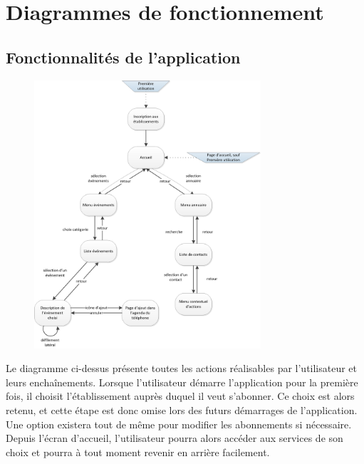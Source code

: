 \chapter{Diagrammes de fonctionnement}

\section{Fonctionnalités de l'application}

\begin{figure}[h]
  \center
  \includegraphics[width=0.75\textwidth]{resources/features1.png}
\end{figure}

\newpage

Le diagramme ci-dessus présente toutes les actions réalisables par l'utilisateur et leurs enchaînements.
Lorsque l'utilisateur démarre l'application pour la première fois, il choisit l'établissement auprès duquel il veut s'abonner.
Ce choix est alors retenu, et cette étape est donc omise lors des futurs démarrages de l'application. Une option existera tout de même pour modifier les abonnements si nécessaire. Depuis l'écran d'accueil, l'utilisateur pourra alors accéder aux services de son choix et pourra à tout moment revenir en arrière facilement. \\

